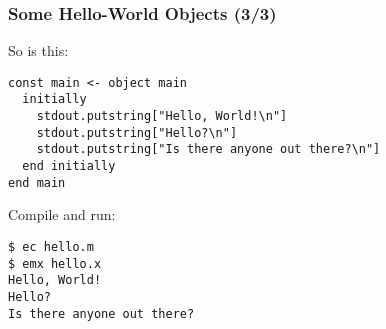 \begin{frame}[fragile]

\frametitle{Some Hello-World Objects (3/3)}

So is this:

\begin{lstlisting}
const main <- object main
  initially
    stdout.putstring["Hello, World!\n"]
    stdout.putstring["Hello?\n"]
    stdout.putstring["Is there anyone out there?\n"]
  end initially
end main
\end{lstlisting}

Compile and run:

\begin{lstlisting}
$ ec hello.m
$ emx hello.x
Hello, World!
Hello?
Is there anyone out there?
\end{lstlisting}

\end{frame}
